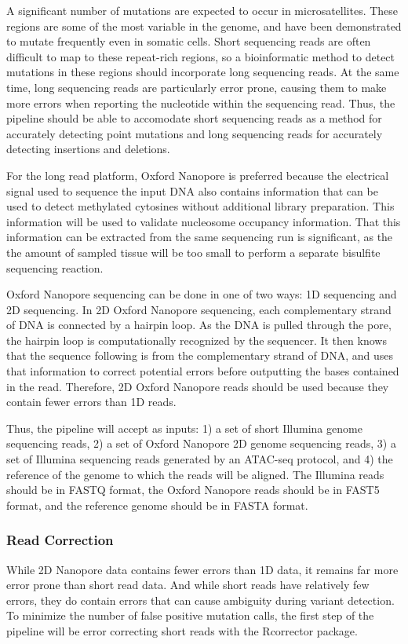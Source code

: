A significant number of mutations are expected to occur in microsatellites.
These regions are some of the most variable in the genome, and have been demonstrated to mutate frequently even in somatic cells.
Short sequencing reads are often difficult to map to these repeat-rich regions, so a bioinformatic method to detect mutations in these regions should incorporate long sequencing reads. At the same time, long sequencing reads are particularly error prone, causing them to make more errors when reporting the nucleotide within the sequencing read. Thus, the pipeline should be able to accomodate short sequencing reads as a method for accurately detecting point mutations and long sequencing reads for accurately detecting insertions and deletions.

For the long read platform, Oxford Nanopore is preferred because the electrical signal used to sequence the input DNA also contains information that can be used to detect methylated cytosines without additional library preparation. This information will be used to validate nucleosome occupancy information. That this information can be extracted from the same sequencing run is significant, as the the amount of sampled tissue will be too small to perform a separate bisulfite sequencing reaction.

Oxford Nanopore sequencing can be done in one of two ways: 1D sequencing and 2D sequencing.
In 2D Oxford Nanopore sequencing, each complementary strand of DNA is connected by a hairpin loop. As the DNA is pulled through the pore, the hairpin loop is computationally recognized by the sequencer. It then knows that the sequence following is from the complementary strand of DNA, and uses that information to correct potential errors before outputting the bases contained in the read.
Therefore, 2D Oxford Nanopore reads should be used because they contain fewer errors than 1D reads.

Thus, the pipeline will accept as inputs: 1) a set of short Illumina genome sequencing reads, 2) a set of Oxford Nanopore 2D genome sequencing reads, 3) a set of Illumina sequencing reads generated by an ATAC-seq protocol, and 4) the reference of the genome to which the reads will be aligned. The Illumina reads should be in FASTQ format, the Oxford Nanopore reads should be in FAST5 format, and the reference genome should be in FASTA format.

\subsubsection{Read Correction}
While 2D Nanopore data contains fewer errors than 1D data, it remains far more error prone than short read data.
And while short reads have relatively few errors, they do contain errors that can cause ambiguity during variant detection.
To minimize the number of false positive mutation calls, the first step of the pipeline will be error correcting short reads with the Rcorrector package.


